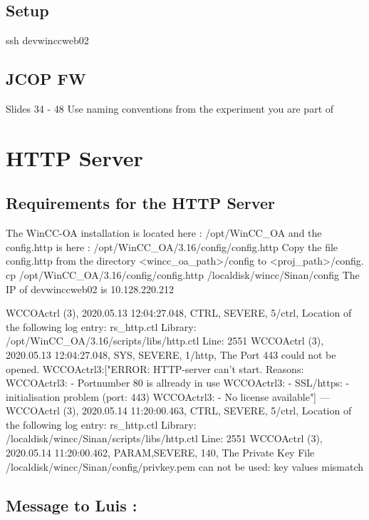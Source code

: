 \documentclass[a4paper, 10pt]{article}
\begin{document}
\subsection*{Setup}
ssh devwinccweb02

\subsection*{JCOP FW}
Slides 34 - 48
Use naming conventions from the experiment you are part of

\newpage
\section{HTTP Server}
\subsection{Requirements for the HTTP Server}
The WinCC-OA installation is located here : /opt/WinCC\_OA and the config.http is here : /opt/WinCC\_OA/3.16/config/config.http
Copy the file config.http from the directory <wincc\_oa\_path>/config to <proj\_path>/config.
cp /opt/WinCC\_OA/3.16/config/config.http /localdisk/wincc/Sinan/config
The IP of devwinccweb02 is 10.128.220.212


WCCOActrl    (3), 2020.05.13 12:04:27.048, CTRL, SEVERE,      5/ctrl, Location of the following log entry: rs\_http.ctl    Library: /opt/WinCC\_OA/3.16/scripts/libs/http.ctl
Line: 2551
WCCOActrl    (3), 2020.05.13 12:04:27.048, SYS,  SEVERE,      1/http, The Port 443 could not be opened.
WCCOActrl3:["ERROR: HTTP-server can't start. Reasons:
WCCOActrl3: - Portnumber 80 is allready in use
WCCOActrl3: - SSL/https: - initialisation problem (port: 443)
WCCOActrl3: - No license available"]
---
WCCOActrl    (3), 2020.05.14 11:20:00.463, CTRL, SEVERE,      5/ctrl, Location of the following log entry: rs\_http.ctl    Library: /localdisk/wincc/Sinan/scripts/libs/http.ctl
    Line: 2551
WCCOActrl    (3), 2020.05.14 11:20:00.462, PARAM,SEVERE,    140, The Private Key File /localdisk/wincc/Sinan/config/privkey.pem can not be used: key values mismatch

\subsection*{Message to Luis :}
\end{document}

